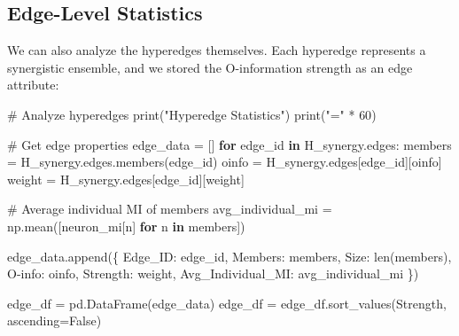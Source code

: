 \documentclass[
  11pt,
  letterpaper,
  oneside,
  openany]{book}
\newenvironment{Shaded}{\begin{snugshade}}{\end{snugshade}}
\newcommand{\BuiltInTok}[1]{\textcolor[rgb]{0.00,0.23,0.31}{#1}}
\newcommand{\CommentTok}[1]{\textcolor[rgb]{0.37,0.37,0.37}{#1}}
\newcommand{\ControlFlowTok}[1]{\textcolor[rgb]{0.00,0.23,0.31}{\textbf{#1}}}
\newcommand{\DecValTok}[1]{\textcolor[rgb]{0.68,0.00,0.00}{#1}}
\newcommand{\KeywordTok}[1]{\textcolor[rgb]{0.00,0.23,0.31}{\textbf{#1}}}
\newcommand{\NormalTok}[1]{\textcolor[rgb]{0.00,0.23,0.31}{#1}}
\newcommand{\OperatorTok}[1]{\textcolor[rgb]{0.37,0.37,0.37}{#1}}
\newcommand{\StringTok}[1]{\textcolor[rgb]{0.13,0.47,0.30}{#1}}
\newcommand{\VariableTok}[1]{\textcolor[rgb]{0.07,0.07,0.07}{#1}}
\begin{document}
\subsection{Edge-Level Statistics}\label{edge-level-statistics}

We can also analyze the hyperedges themselves. Each hyperedge represents
a synergistic ensemble, and we stored the O-information strength as an
edge attribute:

\begin{Shaded}
\begin{Highlighting}[]
\CommentTok{\# Analyze hyperedges}
\BuiltInTok{print}\NormalTok{(}\StringTok{"Hyperedge Statistics"}\NormalTok{)}
\BuiltInTok{print}\NormalTok{(}\StringTok{"="} \OperatorTok{*} \DecValTok{60}\NormalTok{)}

\CommentTok{\# Get edge properties}
\NormalTok{edge\_data }\OperatorTok{=}\NormalTok{ []}
\ControlFlowTok{for}\NormalTok{ edge\_id }\KeywordTok{in}\NormalTok{ H\_synergy.edges:}
\NormalTok{    members }\OperatorTok{=}\NormalTok{ H\_synergy.edges.members(edge\_id)}
\NormalTok{    oinfo }\OperatorTok{=}\NormalTok{ H\_synergy.edges[edge\_id][}\StringTok{\textquotesingle{}oinfo\textquotesingle{}}\NormalTok{]}
\NormalTok{    weight }\OperatorTok{=}\NormalTok{ H\_synergy.edges[edge\_id][}\StringTok{\textquotesingle{}weight\textquotesingle{}}\NormalTok{]}
    
    \CommentTok{\# Average individual MI of members}
\NormalTok{    avg\_individual\_mi }\OperatorTok{=}\NormalTok{ np.mean([neuron\_mi[n] }\ControlFlowTok{for}\NormalTok{ n }\KeywordTok{in}\NormalTok{ members])}
    
\NormalTok{    edge\_data.append(\{}
        \StringTok{\textquotesingle{}Edge\_ID\textquotesingle{}}\NormalTok{: edge\_id,}
        \StringTok{\textquotesingle{}Members\textquotesingle{}}\NormalTok{: members,}
        \StringTok{\textquotesingle{}Size\textquotesingle{}}\NormalTok{: }\BuiltInTok{len}\NormalTok{(members),}
        \StringTok{\textquotesingle{}O{-}info\textquotesingle{}}\NormalTok{: oinfo,}
        \StringTok{\textquotesingle{}Strength\textquotesingle{}}\NormalTok{: weight,}
        \StringTok{\textquotesingle{}Avg\_Individual\_MI\textquotesingle{}}\NormalTok{: avg\_individual\_mi}
\NormalTok{    \})}

\NormalTok{edge\_df }\OperatorTok{=}\NormalTok{ pd.DataFrame(edge\_data)}
\NormalTok{edge\_df }\OperatorTok{=}\NormalTok{ edge\_df.sort\_values(}\StringTok{\textquotesingle{}Strength\textquotesingle{}}\NormalTok{, ascending}\OperatorTok{=}\VariableTok{False}\NormalTok{)}


\end{Highlighting}
\end{Shaded}
\end{document}
